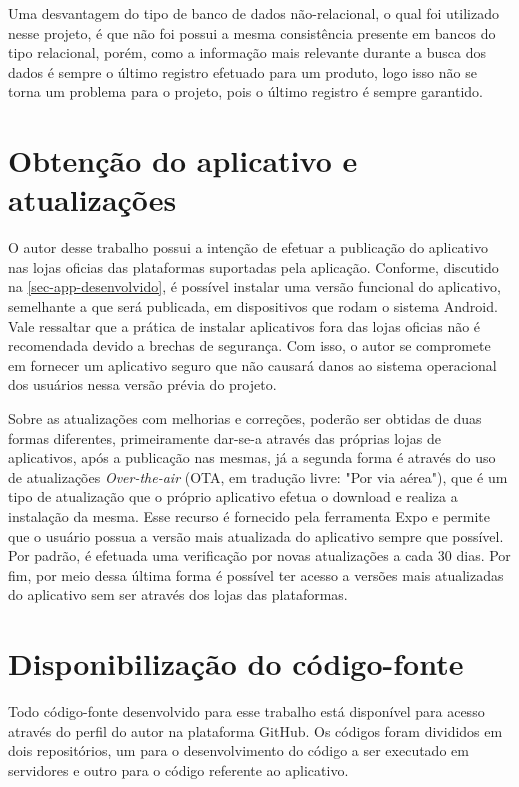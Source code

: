 Uma desvantagem do tipo de banco de dados não-relacional, o qual foi utilizado nesse projeto, é que não foi possui a mesma consistência presente em bancos do tipo relacional, porém, como a informação mais relevante durante a busca dos dados é sempre o último registro efetuado para um produto, logo isso não se torna um problema para o projeto, pois o último registro é sempre garantido.

\section{Obtenção do aplicativo e atualizações}

O autor desse trabalho possui a intenção de efetuar a publicação do aplicativo nas lojas oficias das plataformas suportadas pela aplicação. Conforme, discutido na \autoref{sec-app-desenvolvido}, é possível instalar uma versão funcional do aplicativo, semelhante a que será publicada, em dispositivos que rodam o sistema Android. Vale ressaltar que a prática de instalar aplicativos fora das lojas oficias não é recomendada devido a brechas de segurança. Com isso, o autor se compromete em fornecer um aplicativo seguro que não causará danos ao sistema operacional dos usuários nessa versão prévia do projeto.

Sobre as atualizações com melhorias e correções, poderão ser obtidas de duas formas diferentes, primeiramente dar-se-a através das próprias lojas de aplicativos, após a publicação nas mesmas, já a segunda forma é através do uso de atualizações \textit{Over-the-air} (OTA, em tradução livre: "Por via aérea"), que é um tipo de atualização que o próprio aplicativo efetua o download e realiza a instalação da mesma. Esse recurso é fornecido pela ferramenta Expo e permite que o usuário possua a versão mais atualizada do aplicativo sempre que possível. Por padrão, é efetuada uma verificação por novas atualizações a cada 30 dias. Por fim, por meio dessa última forma é possível ter acesso a versões mais atualizadas do aplicativo sem ser através dos lojas das plataformas.

\section{Disponibilização do código-fonte}

Todo código-fonte desenvolvido para esse trabalho está disponível para acesso através do perfil do autor na plataforma GitHub. Os códigos foram divididos em dois repositórios, um para o desenvolvimento do código a ser executado em servidores e outro para o código referente ao aplicativo.

